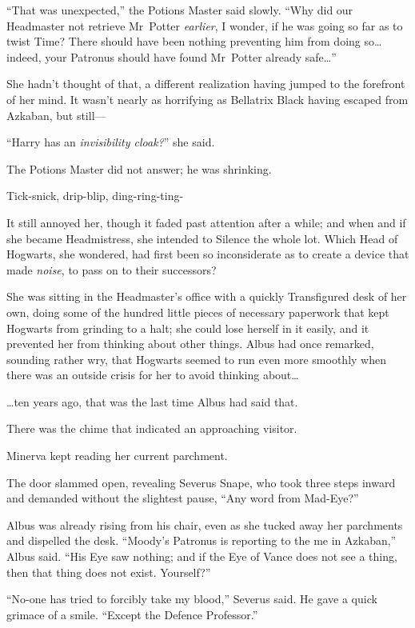 “That was unexpected,” the Potions Master said slowly.
“Why did our Headmaster not retrieve Mr~Potter \emph{earlier}, I wonder, if he was going so far as to twist Time? There should have been nothing preventing him from doing so…indeed, your Patronus should have found Mr~Potter already safe…”

She hadn’t thought of that, a different realization having jumped to the forefront of her mind. It wasn’t nearly as horrifying as Bellatrix Black having escaped from Azkaban, but still—

“Harry has an \emph{invisibility cloak?}” she said.

The Potions Master did not answer; he was shrinking.

\later

Tick-snick, drip-blip, ding-ring-ting-

It still annoyed her, though it faded past attention after a while; and when and if she became Headmistress, she intended to Silence the whole lot. Which Head of Hogwarts, she wondered, had first been so inconsiderate as to create a device that made \emph{noise}, to pass on to their successors?

She was sitting in the Headmaster’s office with a quickly Transfigured desk of her own, doing some of the hundred little pieces of necessary paperwork that kept Hogwarts from grinding to a halt; she could lose herself in it easily, and it prevented her from thinking about other things. Albus had once remarked, sounding rather wry, that Hogwarts seemed to run even more smoothly when there was an outside crisis for her to avoid thinking about…

…ten years ago, that was the last time Albus had said that.

There was the chime that indicated an approaching visitor.

Minerva kept reading her current parchment.

The door slammed open, revealing Severus Snape, who took three steps inward and demanded without the slightest pause,
“Any word from Mad-Eye?”

Albus was already rising from his chair, even as she tucked away her parchments and dispelled the desk.
“Moody’s Patronus is reporting to the me in Azkaban,” Albus said.
“His Eye saw nothing; and if the Eye of Vance does not see a thing, then that thing does not exist. Yourself?”

“No-one has tried to forcibly take my blood,” Severus said. He gave a quick grimace of a smile.
“Except the Defence Professor.”

